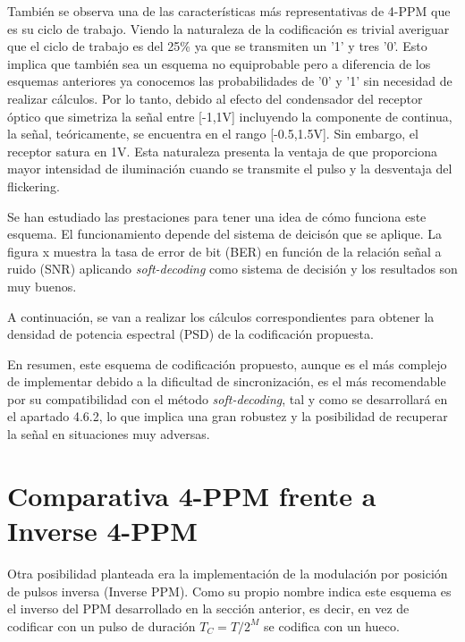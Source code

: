 También se observa una de las características más representativas de 4-PPM que es 
su ciclo de trabajo. Viendo la naturaleza de la codificación es trivial averiguar que 
el ciclo de trabajo es del 25\% ya que se transmiten un '1' y tres '0'. Esto implica que 
también sea un esquema no equiprobable pero a diferencia de los esquemas anteriores ya 
conocemos las probabilidades de '0' y '1' sin necesidad de realizar cálculos. Por lo 
tanto, debido al efecto del condensador del receptor óptico que simetriza la señal entre
[-1,1V] incluyendo la componente de continua, la señal, teóricamente, se encuentra en el 
rango [-0.5,1.5V]. Sin embargo, el receptor satura en 1V. Esta naturaleza presenta 
la ventaja de que proporciona mayor intensidad de iluminación cuando se transmite el 
pulso y la desventaja del flickering.

Se han estudiado las prestaciones para tener una idea de cómo funciona este esquema.
El funcionamiento depende del sistema de deicisón que se aplique. La figura x muestra
la tasa de error de bit (BER) en función de la relación señal a ruido (SNR) aplicando
\textit{soft-decoding} como sistema de decisión y los resultados son muy buenos.

A continuación, se van a realizar los cálculos correspondientes para obtener la 
densidad de potencia espectral (PSD) de la codificación propuesta.

En resumen, este esquema de codificación propuesto, aunque es el más complejo de 
implementar debido a la dificultad de sincronización, es el más recomendable por su 
compatibilidad con el método \textit{soft-decoding}, tal y como se desarrollará en el 
apartado 4.6.2, lo que implica una gran robustez y la posibilidad de recuperar la 
señal en situaciones muy adversas.

\section{Comparativa 4-PPM frente a Inverse 4-PPM}
Otra posibilidad planteada era la implementación de la modulación por posición de 
pulsos inversa (Inverse PPM). Como su propio nombre indica este esquema es el inverso
del PPM desarrollado en la sección anterior, es decir, en vez de codificar con un pulso
de duración $ T_C = T/2^M $ se codifica con un hueco.

